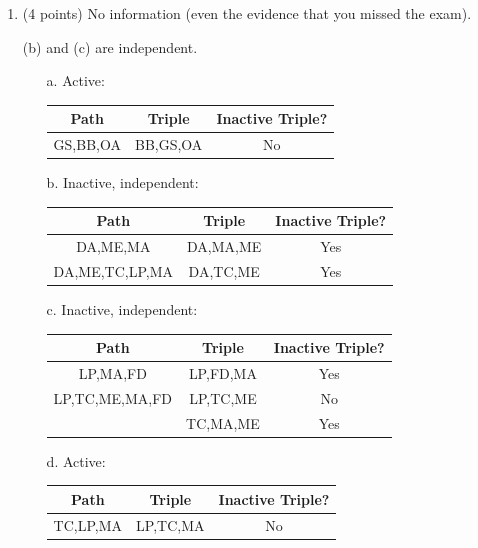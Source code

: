 \documentclass[12pt]{article}
\begin{document}
\begin{enumerate}

	\item (4 points) No information (even the evidence that you missed the exam).

	(b) and (c) are independent.

	\begin{enumerate}
		\item[a.]
		Active:
		\begin{center}
			\begin{tabular}{|c|c|c|}
				\hline
				Path & Triple & Inactive Triple? \\
				\hline
				GS,BB,OA & BB,GS,OA & No \\
				\hline
			\end{tabular}
		\end{center}

		\item[b.]
		Inactive, independent:
		\begin{center}
			\begin{tabular}{|c|c|c|}
				\hline
				Path & Triple & Inactive Triple? \\
				\hline
				DA,ME,MA & DA,MA,ME & Yes \\
				\hline
				DA,ME,TC,LP,MA & DA,TC,ME & Yes \\
				\hline
			\end{tabular}
		\end{center}

		\item[c.]
		Inactive, independent:
		\begin{center}
			\begin{tabular}{|c|c|c|}
				\hline
				Path & Triple & Inactive Triple? \\
				\hline
				LP,MA,FD & LP,FD,MA & Yes \\
				\hline
				LP,TC,ME,MA,FD & LP,TC,ME & No \\
				& TC,MA,ME & Yes \\
				\hline
			\end{tabular}
		\end{center}

		\item[d.]
		Active:
		\begin{center}
			\begin{tabular}{|c|c|c|}
				\hline
				Path & Triple & Inactive Triple? \\
				\hline
				TC,LP,MA & LP,TC,MA & No \\
				\hline
			\end{tabular}
		\end{center}


\end{enumerate}
\end{enumerate}
\end{document}
